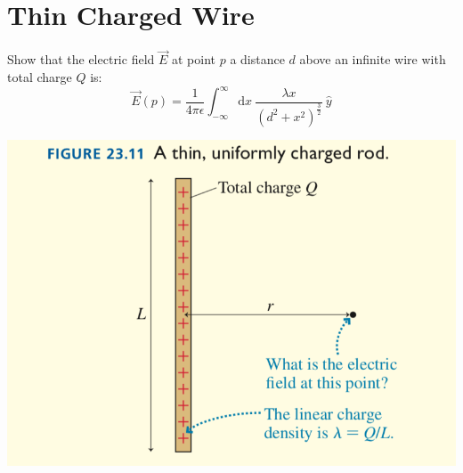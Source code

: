 \documentclass{article}
\begin{document}
\section{Thin Charged Wire}

Show that the electric field $\vec{E}$ at point $p$ a distance $d$ above an infinite wire with total charge $Q$ is: 
$$\vec{E}(p) = \frac{1}{4\pi\epsilon}\int_{-\infty}^\infty \! \mathrm{d}x \ \frac{\lambda x}{(d^2 + x^2)^\frac{3}{2}}  \ \hat{y}$$

\includegraphics[width=.4\linewidth]{W2a_fig3.png}
\end{document}
